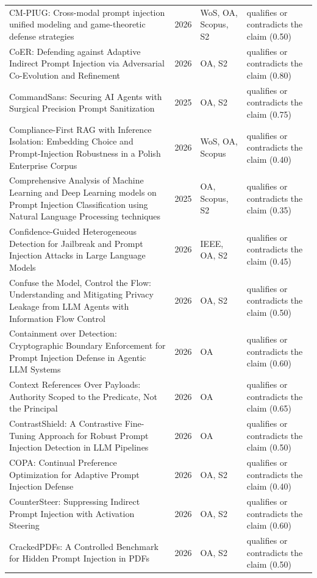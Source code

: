 \begin{longtable}{@{}%
  >{\raggedright\arraybackslash}p{}c%
  >{\raggedright\arraybackslash}p{}%
  >{\raggedright\arraybackslash}p{}@{}}
CM-PIUG: Cross-modal prompt injection unified modeling and game-theoretic defense strategies & 2026 & WoS, OA, Scopus, S2 & qualifies or contradicts the claim (0.50) \\
CoER: Defending against Adaptive Indirect Prompt Injection via Adversarial Co-Evolution and Refinement & 2026 & OA, S2 & qualifies or contradicts the claim (0.80) \\
CommandSans: Securing AI Agents with Surgical Precision Prompt Sanitization & 2025 & OA, S2 & qualifies or contradicts the claim (0.75) \\
Compliance-First RAG with Inference Isolation: Embedding Choice and Prompt-Injection Robustness in a Polish Enterprise Corpus & 2026 & WoS, OA, Scopus & qualifies or contradicts the claim (0.40) \\
Comprehensive Analysis of Machine Learning and Deep Learning models on Prompt Injection Classification using Natural Language Processing techniques & 2025 & OA, Scopus, S2 & qualifies or contradicts the claim (0.35) \\
Confidence-Guided Heterogeneous Detection for Jailbreak and Prompt Injection Attacks in Large Language Models & 2026 & IEEE, OA, S2 & qualifies or contradicts the claim (0.45) \\
Confuse the Model, Control the Flow: Understanding and Mitigating Privacy Leakage from LLM Agents with Information Flow Control & 2026 & OA, S2 & qualifies or contradicts the claim (0.50) \\
Containment over Detection: Cryptographic Boundary Enforcement for Prompt Injection Defense in Agentic LLM Systems & 2026 & OA & qualifies or contradicts the claim (0.60) \\
Context References Over Payloads: Authority Scoped to the Predicate, Not the Principal & 2026 & OA & qualifies or contradicts the claim (0.65) \\
ContrastShield: A Contrastive Fine-Tuning Approach for Robust Prompt Injection Detection in LLM Pipelines & 2026 & OA & qualifies or contradicts the claim (0.50) \\
COPA: Continual Preference Optimization for Adaptive Prompt Injection Defense & 2026 & OA, S2 & qualifies or contradicts the claim (0.40) \\
CounterSteer: Suppressing Indirect Prompt Injection with Activation Steering & 2026 & OA, S2 & qualifies or contradicts the claim (0.60) \\
CrackedPDFs: A Controlled Benchmark for Hidden Prompt Injection in PDFs & 2026 & OA, S2 & qualifies or contradicts the claim (0.50) \\

\end{longtable}
